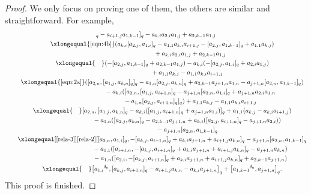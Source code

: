 \documentclass[pdftex]{sigma}
\numberwithin{equation}{section}
\def\d{\delta}
\begin{document}
\begin{proof}
We only focus on proving one of them, the others are similar and straightforward. For example,
\begin{gather*}
 [a_{2,i}, [a_{k,j},a_{1,i} ]_q -a_{i+1,j}a_{1,k-1} ]_q-a_{k,i}a_{2,i}a_{1,j}+a_{2,k-1}a_{1,j}\\
\qquad \xlongequal{\eqref{eqn:4b}} (a_{k,i} [a_{2,j},a_{1,i} ]_q-a_{1,1}a_{k,i}a_{i+1,j} - [a_{2,j},a_{1,k-1} ]_q+a_{1,1}a_{k,j} ) \\
\phantom{\qquad \xlongequal{\qquad} }{}
+a_{k,i}a_{2,i}a_{1,j}+a_{2,k-1}a_{1,j}\\
\qquad \xlongequal{\quad} (- [a_{2,j},a_{1,k-1} ]_q+a_{2,k-1}a_{1,j} )
-a_{k,i} (- [a_{2,j},a_{1,i} ]_q+a_{2,i}a_{1,j} )\\
\qquad\phantom{ \xlongequal{\quad} }{}
 +a_{1,1}a_{k,j}-a_{1,1}a_{k,i}a_{i+1,j}\\
\qquad \xlongequal{\eqref{eqn:2a}} ( [a_{2,n}, [a_{1,j},a_{k,n} ]_q ]_q-a_{1,n} [a_{2,j},a_{k,n} ]_q +a_{2,k-1}a_{j+1,n}a_{1,n}-a_{j+1,n} [a_{2,n},a_{1,k-1} ]_q )\\
\phantom{\qquad \xlongequal{\qquad} }{} -a_{k,i} ( [a_{2,n}, [a_{1,j},a_{i+1,n} ]_q -a_{j+1,n} [a_{2,n},a_{1,i} ]_q +a_{j+1,n}a_{2,i}a_{1,n}\\
\phantom{\qquad \xlongequal{\qquad} }{} -a_{1,n} [a_{2,j},a_{i+1,n} ]_q ]_q )+a_{1,1}a_{k,j}-a_{1,1}a_{k,i}a_{i+1,j}\\
\qquad \xlongequal{\quad} [a_{2,n}, [a_{1,j},a_{k,n} ]_q -a_{k,i} ( [a_{1,j},a_{i+1,n} ]_q +a_{j+1,n}a_{1,i} ) ]_q +a_{1,1} (a_{k,j}-a_{k,i}a_{i+1,j} ) \\
\phantom{\qquad \xlongequal{\quad} }{} -a_{1,n} ( [a_{2,j},a_{k,n} ]_q-a_{2,k-1}a_{j+1,n} +a_{k,i} ( [a_{2,j},a_{i+1,n} ]_q-a_{j+1,n}a_{2,i} ) )\\
 \phantom{\qquad \xlongequal{\quad} }{} -a_{j+1,n} [a_{2,n},a_{1,k-1} ]_q\\
 \qquad\xlongequal[\eqref{rela-3}]{\eqref{rela-2}} [ [a_{2,n},a_{1,i} ]_q , - [a_{k,j},a_{i+1,n} ]_q+a_{k,i}a_{j+1,n}+a_{i+1,j}a_{k,n} ]_q -a_{j+1,n} [a_{2,n},a_{1,k-1} ]_q\\
\phantom{\qquad \xlongequal{\qquad} }{} -a_{1,1} ( [a_{i+1,n},- [a_{k,j},a_{i+1,n} ]_q+a_{k,i}a_{j+1,n}+a_{i+1,j}a_{k,n} ]_q -a_{j+1,n}a_{k,n} ) \\
\phantom{\qquad \xlongequal{\qquad} }{} -a_{1,n} ( [a_{2,i},- [a_{k,j},a_{i+1,n} ]_q+a_{k,i}a_{j+1,n}+a_{i+1,j}a_{k,n} ]_q +a_{2,k-1}a_{j+1,n} )\\
\qquad \xlongequal{\quad} \bigl[{a_{1,i}}^{\d_0}, [a_{k,j},a_{i+1,n} ]_q -a_{i+1,j}a_{k,n}-a_{k,i}a_{j+1,n} \bigr]_q+ \bigl[{a_{1,k-1}}^{\d_0},a_{j+1,n} \bigr]_q.
\end{gather*}
This proof is finished.
\end{proof}
\end{document}
